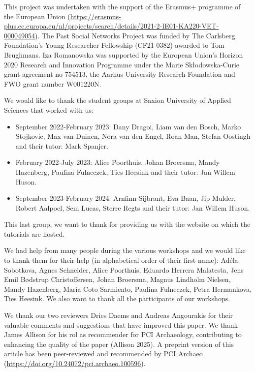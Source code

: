 \documentclass[
]{article}
\begin{document}
This project was undertaken with the support of the Erasmus+ programme of the European Union (\url{https://erasmus-plus.ec.europa.eu/nl/projects/search/details/2021-2-IE01-KA220-VET-000049054}). The Past Social Networks Project was funded by The Carlsberg Foundation's Young Researcher Fellowship (CF21-0382) awarded to Tom Brughmans. Iza Romanowska was supported by the European Union's Horizon 2020 Research and Innovation Programme under the Marie Skłodowska-Curie grant agreement no 754513, the Aarhus University Research Foundation and FWO grant number W001220N.

We would like to thank the student groups at Saxion University of Applied Sciences that worked with us:

\begin{itemize}
\item
  September 2022-February 2023: Dany Dragoi, Liam van den Bosch, Marko Stojkovic, Max van Duinen, Nora van den Engel, Roan Man, Stefan Oostingh and their tutor: Mark Spanjer.
\item
  February 2022-July 2023: Alice Poorthuis, Johan Broersma, Mandy Hazenberg, Paulina Fulneczek, Ties Heesink and their tutor: Jan Willem Huson.
\item
  September 2023-February 2024: Arnfinn Sijbrant, Eva Baan, Jip Mulder, Robert Aalpoel, Sem Lucas, Sterre Regts and their tutor: Jan Willem Huson.
\end{itemize}

This last group, we want to thank for providing us with the website on which the tutorials are hosted.

We had help from many people during the various workshops and we would like to thank them for their help (in alphabetical order of their first name): Adéla Sobotkova, Agnes Schneider, Alice Poorthuis, Eduardo Herrera Malatesta, Jens Emil Bødstrup Christoffersen, Johan Broersma, Magnus Lindholm Nielsen, Mandy Hazenberg, María Coto Sarmiento, Paulina Fulneczek, Petra Hermankova, Ties Heesink. We also want to thank all the participants of our workshops.

We thank our two reviewers Dries Daems and Andreas Angourakis for their valuable comments and suggestions that have improved this paper. We thank James Allison for his rol as recommender for PCI Archaeology, contributing to enhancing the quality of the paper (Allison 2025). A preprint version of this article has been peer-reviewed and recommended by PCI Archaeo (\url{https://doi.org/10.24072/pci.archaeo.100596}).
\end{document}
